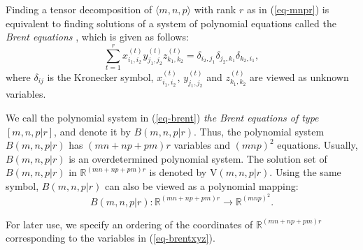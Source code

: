 \documentclass[reqno]{amsart}
\theoremstyle{definition}
\numberwithin{equation}{section}
\theoremstyle{remark}
\begin{document}
Finding a tensor decomposition of $\langle m,n,p \rangle$ with rank $r$ as in (\ref{eq-mnpr}) is equivalent to finding solutions of a system of polynomial equations called the \emph{Brent equations} \cite{Brent70,Heule21,Smir-13}, which is given as follows:
\begin{equation}\label{eq-brent}
\sum_{t=1}^{r} x_{i_1,i_2}^{(t)}y_{j_1,j_2}^{(t)}z_{k_1,k_2}^{(t)}=
\delta_{i_2,j_1}\delta_{j_2,k_1}\delta_{k_2,i_1},
\end{equation}
where $\delta_{ij}$ is the Kronecker symbol, $x_{i_1,i_2}^{(t)}$, $y_{j_1,j_2}^{(t)}$ and $z_{k_1,k_2}^{(t)}$ are viewed as unknown variables.

We call the polynomial system in (\ref{eq-brent}) \emph{the Brent equations of type $[m,n,p|r]$}, and denote it by  $B(m,n,p|r)$. Thus, the polynomial system $B(m,n,p|r)$ has $(mn+np+pm)r$ variables and $(mnp)^2$ equations. Usually, $B(m,n,p|r)$ is an overdetermined polynomial system. The solution set of $B(m,n,p|r)$ in $\mathbb{R}^{(mn+np+pm)r}$ is denoted by $\mathrm{V}(m,n,p|r)$. Using the same symbol, $B(m,n,p|r)$ can also be viewed as a polynomial mapping:
$$B(m,n,p|r)\colon \mathbb{R}^{(mn+np+pm)r}\to \mathbb{R}^{(mnp)^2}.$$


For later use, we specify an ordering of the coordinates of
$\mathbb{R}^{(mn+np+pm)r}$ corresponding to the variables in
(\ref{eq-brentxyz}).
\end{document}
